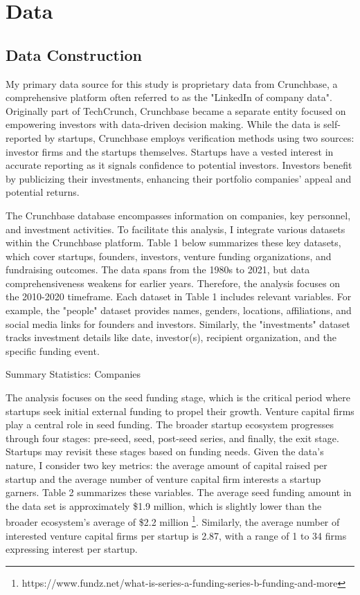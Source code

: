 \section{Data} \label{sec:data}
\subsection{Data Construction}
\hspace *{0mm} My primary data source for this study is proprietary data from Crunchbase, a comprehensive platform often referred to as the "LinkedIn of company data".  Originally part of TechCrunch, Crunchbase became a separate entity focused on empowering investors with data-driven decision making. While the data is self-reported by startups, Crunchbase employs verification methods using two sources: investor firms and the startups themselves.  Startups have a vested interest in accurate reporting as it signals confidence to potential investors. Investors benefit by publicizing their investments, enhancing their portfolio companies' appeal and potential returns.

The Crunchbase database encompasses information on companies, key personnel, and investment activities. To facilitate this analysis, I integrate various datasets within the Crunchbase platform. Table 1 below summarizes these key datasets, which cover startups, founders, investors, venture funding organizations, and fundraising outcomes. The data spans from the 1980s to 2021, but data comprehensiveness weakens for earlier years. Therefore, the analysis focuses on the 2010-2020 timeframe. Each dataset in Table 1 includes relevant variables. For example, the "people" dataset provides names, genders, locations, affiliations, and social media links for founders and investors. Similarly, the "investments" dataset tracks investment details like date, investor(s), recipient organization, and the specific funding event.

\begin{table}[H]
 \captionsetup{justification=raggedright,singlelinecheck=false}
    \caption{Summary Statistics: Companies}
        
\end{table}


\hspace *{0mm} The analysis focuses on the seed funding stage, which is the critical period where startups seek initial external funding to propel their growth.  Venture capital firms play a central role in seed funding.  The broader startup ecosystem progresses through four stages: pre-seed, seed, post-seed series, and finally, the exit stage. Startups may revisit these stages based on funding needs. Given the data's nature, I consider two key metrics: the average amount of capital raised per startup and the average number of venture capital firm interests a startup garners. Table 2 summarizes these variables. The average seed funding amount in the data set is approximately \$1.9 million, which is slightly lower than the broader ecosystem's average of \$2.2 million \footnote[2]{https://www.fundz.net/what-is-series-a-funding-series-b-funding-and-more}. Similarly, the average number of interested venture capital firms per startup is 2.87, with a range of 1 to 34 firms expressing interest per startup.

